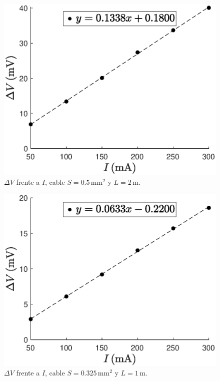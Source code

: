 \begin{figure}[h!]
    \begin{center}
        \includegraphics[width=0.8\columnwidth]{files/images/S2L3}
    \end{center}
    \caption{$\Delta V$ frente a $I$, cable $S = 0.5\,$mm$^2$ y $L = 2\,$m.}
    \label{fig:S2L3}
\end{figure}

\begin{figure}[h!]
    \begin{center}
        \includegraphics[width=0.8\columnwidth]{files/images/S3L1}
    \end{center}
    \caption{$\Delta V$ frente a $I$, cable $S = 0.325\,$mm$^2$ y $L = 1\,$m.}
    \label{fig:S3L1}
\end{figure}

